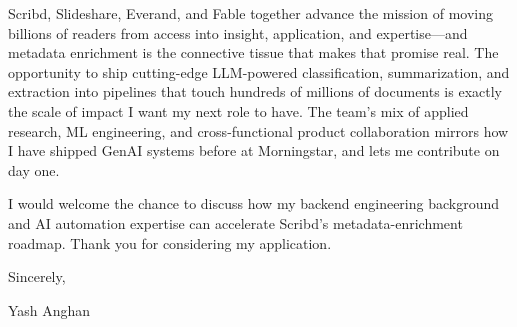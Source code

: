 \documentclass[11pt,letterpaper]{article}
\begin{document}
Scribd, Slideshare, Everand, and Fable together advance the mission of moving billions of readers from access into insight, application, and expertise---and metadata enrichment is the connective tissue that makes that promise real. The opportunity to ship cutting-edge LLM-powered classification, summarization, and extraction into pipelines that touch hundreds of millions of documents is exactly the scale of impact I want my next role to have. The team's mix of applied research, ML engineering, and cross-functional product collaboration mirrors how I have shipped GenAI systems before at Morningstar, and lets me contribute on day one.

I would welcome the chance to discuss how my backend engineering background and AI automation expertise can accelerate Scribd's metadata-enrichment roadmap. Thank you for considering my application.

Sincerely,

Yash Anghan
\end{document}
